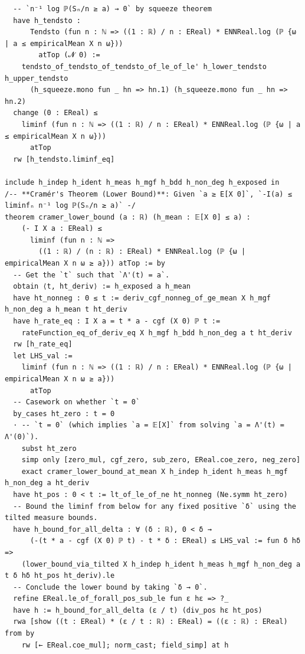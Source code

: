 \newpage
\begin{lstlisting}
  -- `n⁻¹ log ℙ(Sₙ/n ≥ a) → 0` by squeeze theorem
  have h_tendsto :
      Tendsto (fun n : ℕ => ((1 : ℝ) / n : EReal) * ENNReal.log (ℙ {ω | a ≤ empiricalMean X n ω}))
        atTop (𝓝 0) :=
    tendsto_of_tendsto_of_tendsto_of_le_of_le' h_lower_tendsto h_upper_tendsto
      (h_squeeze.mono fun _ hn => hn.1) (h_squeeze.mono fun _ hn => hn.2)
  change (0 : EReal) ≤
    liminf (fun n : ℕ => ((1 : ℝ) / n : EReal) * ENNReal.log (ℙ {ω | a ≤ empiricalMean X n ω}))
      atTop
  rw [h_tendsto.liminf_eq]

include h_indep h_ident h_meas h_mgf h_bdd h_non_deg h_exposed in
/-- **Cramér's Theorem (Lower Bound)**: Given `a ≥ E[X 0]`, `-I(a) ≤ liminfₙ n⁻¹ log ℙ(Sₙ/n ≥ a)` -/
theorem cramer_lower_bound (a : ℝ) (h_mean : 𝔼[X 0] ≤ a) :
    (- I X a : EReal) ≤
      liminf (fun n : ℕ =>
        ((1 : ℝ) / (n : ℝ) : EReal) * ENNReal.log (ℙ {ω | empiricalMean X n ω ≥ a})) atTop := by
  -- Get the `t` such that `Λ'(t) = a`.
  obtain ⟨t, ht_deriv⟩ := h_exposed a h_mean
  have ht_nonneg : 0 ≤ t := deriv_cgf_nonneg_of_ge_mean X h_mgf h_non_deg a h_mean t ht_deriv
  have h_rate_eq : I X a = t * a - cgf (X 0) ℙ t :=
    rateFunction_eq_of_deriv_eq X h_mgf h_bdd h_non_deg a t ht_deriv
  rw [h_rate_eq]
  let LHS_val :=
    liminf (fun n : ℕ => ((1 : ℝ) / n : EReal) * ENNReal.log (ℙ {ω | empiricalMean X n ω ≥ a}))
      atTop
  -- Casework on whether `t = 0`
  by_cases ht_zero : t = 0
  · -- `t = 0` (which implies `a = 𝔼[X]` from solving `a = Λ'(t) = Λ'(0)`).
    subst ht_zero
    simp only [zero_mul, cgf_zero, sub_zero, EReal.coe_zero, neg_zero]
    exact cramer_lower_bound_at_mean X h_indep h_ident h_meas h_mgf h_non_deg a ht_deriv
  have ht_pos : 0 < t := lt_of_le_of_ne ht_nonneg (Ne.symm ht_zero)
  -- Bound the liminf from below for any fixed positive `δ` using the tilted measure bounds.
  have h_bound_for_all_delta : ∀ (δ : ℝ), 0 < δ →
      (-(t * a - cgf (X 0) ℙ t) - t * δ : EReal) ≤ LHS_val := fun δ hδ =>
    (lower_bound_via_tilted X h_indep h_ident h_meas h_mgf h_non_deg a t δ hδ ht_pos ht_deriv).le
  -- Conclude the lower bound by taking `δ → 0`.
  refine EReal.le_of_forall_pos_sub_le fun ε hε => ?_
  have h := h_bound_for_all_delta (ε / t) (div_pos hε ht_pos)
  rwa [show ((t : EReal) * (ε / t : ℝ) : EReal) = ((ε : ℝ) : EReal) from by
    rw [← EReal.coe_mul]; norm_cast; field_simp] at h
\end{lstlisting}
\newpage
